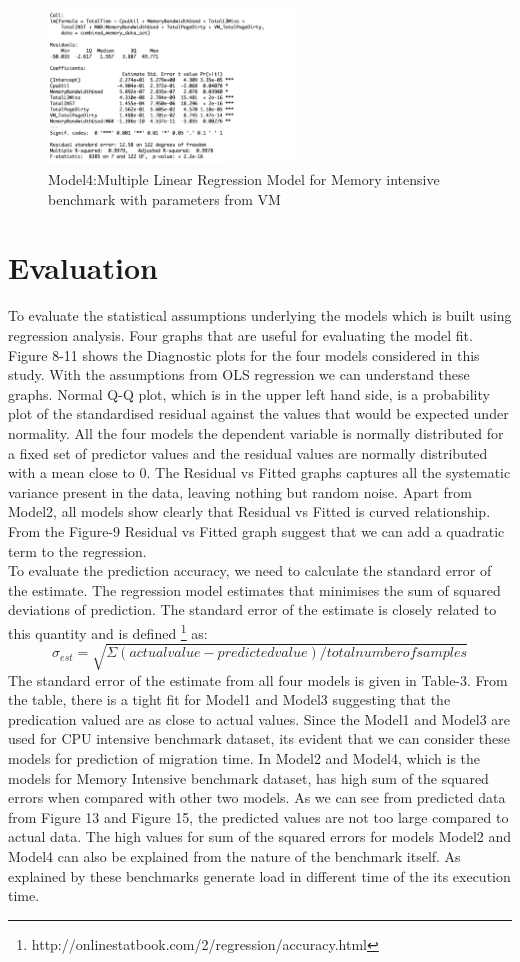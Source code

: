 \documentclass[a4paper,10pt,twoside]{article}
\begin{document}
\begin{figure}[h]
\centering
\includegraphics[width=250px]{MEMORY_COMBINED_MODEL}
\caption{Model4:Multiple Linear Regression Model for Memory intensive benchmark with parameters from VM}
\end{figure}
\section{Evaluation}
To evaluate the statistical assumptions underlying the models which is built using regression analysis. Four graphs that are useful for evaluating the model fit. Figure 8-11 \cite{kabacoff2011r} shows the Diagnostic plots for the four models considered in this study. With the assumptions from OLS regression we can understand these graphs. Normal Q-Q plot, which is in the upper left hand side, is a probability plot of the standardised residual against the values that would be expected under normality. All the four models the dependent variable is normally distributed for a fixed set of predictor values and the residual values are normally distributed with a mean close to 0. The Residual vs Fitted graphs captures all the systematic variance present in the data, leaving nothing but random noise. Apart from Model2, all models show clearly that Residual vs Fitted is curved  relationship. From the Figure-9 Residual vs Fitted graph suggest that we can add a quadratic term to the regression. \\
To evaluate the prediction accuracy, we need to calculate the standard error of the estimate. The regression model estimates that minimises the sum of squared deviations of prediction. The standard error of the estimate is closely related to this quantity and is defined \footnote{http://onlinestatbook.com/2/regression/accuracy.html} as:  
\begin{equation}
\sigma_{est} = \sqrt{\Sigma(actual value - predicted value) / total number of samples}
\end{equation}
The standard error of the estimate from all four models is given in Table-3. From the table, there is a tight fit for Model1 and Model3 suggesting that the predication valued are as close to actual values. Since the Model1 and Model3 are used for CPU intensive benchmark dataset, its evident that we can consider these models for prediction of migration time. In Model2 and Model4, which is the models for Memory Intensive benchmark dataset, has high sum of the squared errors when compared with other two models. As we can see from predicted data from Figure 13 and Figure 15, the predicted values are not too large compared to actual data. The high values for sum of the squared errors for models Model2 and Model4 can also be explained from the nature of the benchmark itself. As explained by \cite{jaleel2010memory} these benchmarks generate load in different time of the its execution time. 
\end{document}
